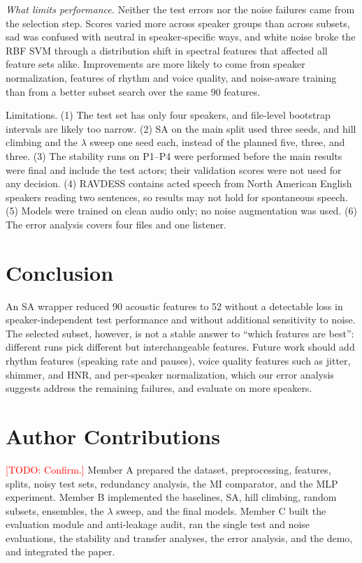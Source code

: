 \documentclass[conference]{IEEEtran}
\newcommand{\TODO}[1]{\textcolor{red}{[TODO: #1]}}
\begin{document}
\emph{What limits performance.} Neither the test errors nor the noise failures came from the
selection step. Scores varied more across speaker groups than across subsets, sad was confused with neutral
in speaker-specific ways, and white noise broke the RBF SVM through a distribution shift in
spectral features that affected all feature sets alike. Improvements are more likely to come from
speaker normalization, features of rhythm and voice quality, and noise-aware training than from a
better subset search over the same 90 features.

Limitations. (1) The test set has only four speakers, and file-level bootstrap intervals are
likely too narrow. (2) SA on the main split used three seeds, and hill climbing and the $\lambda$
sweep one seed each, instead of the planned five, three, and three. (3) The stability runs on
P1--P4 were performed before the main results were final and include the test actors; their
validation scores were not used for any decision. (4) RAVDESS contains acted speech from
North American English speakers reading two sentences, so results may not hold for spontaneous
speech. (5) Models were trained on clean audio only; no noise augmentation was used. (6) The
error analysis covers four files and one listener.

\section{Conclusion}

An SA wrapper reduced 90 acoustic features to 52 without a detectable loss in speaker-independent
test performance and without additional sensitivity to noise. The selected subset, however, is
not a stable answer to ``which features are best'': different runs pick different but
interchangeable features. Future work should add rhythm features (speaking rate and pauses),
voice quality features such as jitter, shimmer, and HNR, and per-speaker normalization, which
our error analysis suggests address the remaining failures, and evaluate on more speakers.

\section*{Author Contributions}
\TODO{Confirm.} Member A prepared the dataset, preprocessing, features, splits, noisy test sets,
redundancy analysis, the MI comparator, and the MLP experiment. Member B implemented the
baselines, SA, hill climbing, random subsets, ensembles, the $\lambda$ sweep, and the final
models. Member C built the evaluation module and anti-leakage audit, ran the single test and noise
evaluations, the stability and transfer analyses, the error analysis, and the demo, and integrated
the paper.
\end{document}
